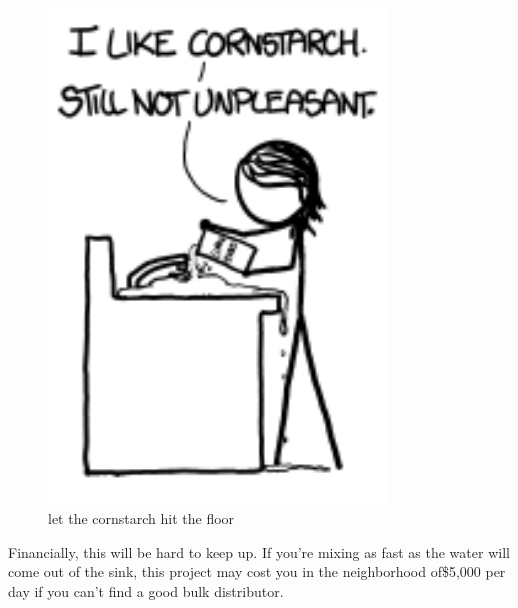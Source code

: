 \begin{figure}[!htbp]
\centering
\includegraphics[scale=0.5, max width=0.8\textwidth]{imgs/a/36/cornstarch_floor.png}
\caption{let the cornstarch hit the floor}
\end{figure}

{Financially, this will be hard to keep up. If you’re mixing as fast as the water will come out of the sink, this project may cost you in the neighborhood of\$5,000 per day if you can’t find a good bulk distributor.}

